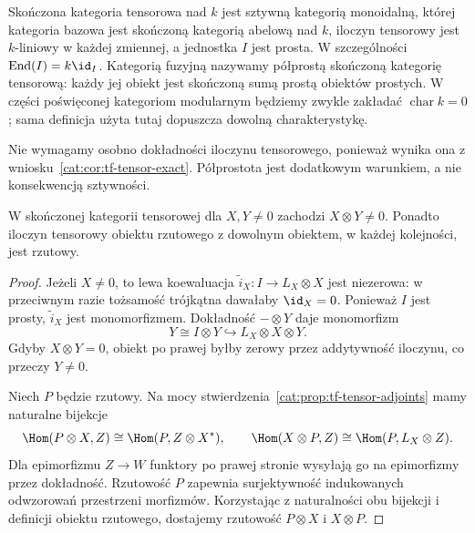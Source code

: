 \begin{definicja}\label{cat:def:tf-finite-tensor-fusion}
Skończona kategoria tensorowa nad $k$ jest sztywną kategorią monoidalną, której kategoria bazowa jest skończoną kategorią abelową nad $k$, iloczyn tensorowy jest $k$-liniowy w każdej zmiennej, a jednostka $I$ jest prosta. W szczególności $\operatorname{End}(I)=k\id_I$. Kategorią fuzyjną nazywamy półprostą skończoną kategorię tensorową: każdy jej obiekt jest skończoną sumą prostą obiektów prostych. W części poświęconej kategoriom modularnym będziemy zwykle zakładać $\operatorname{char} k=0$; sama definicja użyta tutaj dopuszcza dowolną charakterystykę.
\end{definicja}

Nie wymagamy osobno dokładności iloczynu tensorowego, ponieważ wynika ona z wniosku~\ref{cat:cor:tf-tensor-exact}. Półprostota jest dodatkowym warunkiem, a nie konsekwencją sztywności.

\begin{stwierdzenie}\label{cat:prop:tf-projectives-tensor}
W skończonej kategorii tensorowej dla $X,Y\neq0$ zachodzi $X\otimes Y\neq0$. Ponadto iloczyn tensorowy obiektu rzutowego z dowolnym obiektem, w każdej kolejności, jest rzutowy.
\end{stwierdzenie}
\begin{proof}
Jeżeli $X\neq0$, to lewa koewaluacja $\widetilde i_X:I\to L_X\otimes X$ jest niezerowa: w przeciwnym razie tożsamość trójkątna dawałaby $\id_X=0$. Ponieważ $I$ jest prosty, $\widetilde i_X$ jest monomorfizmem. Dokładność $-\otimes Y$ daje monomorfizm
\[
 Y\cong I\otimes Y\hookrightarrow L_X\otimes X\otimes Y.
\]
Gdyby $X\otimes Y=0$, obiekt po prawej byłby zerowy przez addytywność iloczynu, co przeczy $Y\neq0$.

Niech $P$ będzie rzutowy. Na mocy stwierdzenia~\ref{cat:prop:tf-tensor-adjoints} mamy naturalne bijekcje
\[
 \Hom(P\otimes X,Z)\cong\Hom(P,Z\otimes X^*),\qquad
 \Hom(X\otimes P,Z)\cong\Hom(P,L_X\otimes Z).
\]
Dla epimorfizmu $Z\to W$ funktory po prawej stronie wysyłają go na epimorfizmy przez dokładność. Rzutowość $P$ zapewnia surjektywność indukowanych odwzorowań przestrzeni morfizmów. Korzystając z naturalności obu bijekcji i definicji obiektu rzutowego, dostajemy rzutowość $P\otimes X$ i $X\otimes P$.
\end{proof}

